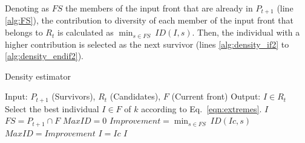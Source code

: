 %
Denoting as $FS$ the members of the input front that are already in $P_{t+1}$ (line \ref{alg:FS}), the contribution to diversity
of each member of the input front that belongs to $R_t$ is calculated as $\displaystyle{\min_{s \in FS}\ ID(I, s)}$.
%
Then, the individual with a higher contribution is selected as the next survivor (lines \ref{alg:density_if2} to \ref{alg:density_endif2}).%

\begin{algorithm}[t]
	\caption{Density estimator} 
\begin{small}
\begin{algorithmic}[1]
\STATE Input: $P_{t+1}$ (Survivors), $R_t$ (Candidates), $F$ (Current front)
    	\STATE Output: $I \in R_t$ 
        \label{alg:density_for}
	      \STATE Select the best individual $I \in F$ of $k$ according to Eq.~\ref{eqn:extremes}.\label{alg:density_1}
	  	 \RETURN $I$ \label{alg:density_2}
	  	\ENDIF
	\ENDFOR\label{alg:density_endfor}
	\STATE $FS = P_{t+1} \cap F$ \label{alg:FS}
	\STATE $MaxID = 0$ \label{alg:density_for2}
	\STATE $Improvement = \displaystyle{\min_{s \in FS}\ ID(Ic, s)}$ 
	 \label{alg:density_if2}
	   \STATE $MaxID = Improvement$
	   \STATE $I = Ic$ 
	\ENDIF \label{alg:density_endif2}
	\ENDFOR	\label{alg:density_endfor2}
    	\RETURN $I$ \label{alg:density_4}
	\end{algorithmic}
\end{small}
\label{alg:Density_Estimator}
\end{algorithm}


%
%
%
%

%
%

